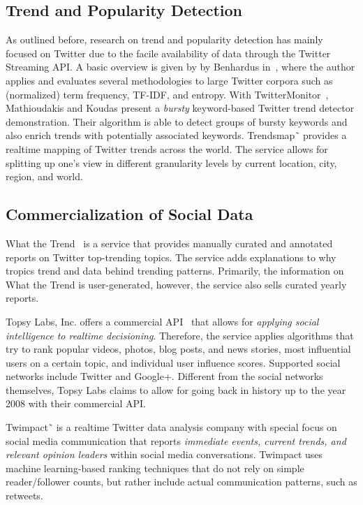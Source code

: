 \documentclass{iosart2c}
\begin{document}
\subsection{Trend and Popularity Detection}
As outlined before, research on trend and popularity detection has mainly focused on Twitter due to the facile availability of data through the Twitter Streaming API.
A basic overview is given by by Benhardus in~\cite{benhardus2010streaming}, where the author applies and evaluates several methodologies to large Twitter corpora such as (normalized) term frequency, TF-IDF, and entropy.
With TwitterMonitor~\cite{Mathioudakis:2010:TTD:1807167.1807306}, Mathioudakis and Koudas present a \textit{bursty} keyword-based Twitter trend detector demonstration.
Their algorithm is able to detect groups of bursty keywords and also enrich trends with potentially associated keywords.
Trendsmap˜\cite{trendsmap} provides a realtime mapping of Twitter trends across the world.
The service allows for splitting up one's view in different granularity levels by current location, city, region, and world.

\subsection{Commercialization of Social Data}
What the Trend~\cite{whatthetrend} is a service that provides manually curated and annotated reports on Twitter top-trending topics.
The service adds explanations to why tropics trend and data behind trending patterns.
Primarily, the information on What the Trend is user-generated, however, the service also sells curated yearly reports.

Topsy Labs, Inc. offers a commercial API~\cite{topsy} that allows for \textit{applying social intelligence to realtime decisioning}.
Therefore, the service applies algorithms that try to rank popular videos, photos, blog posts, and news stories, most influential users on a certain topic, and individual user influence scores.
Supported social networks include Twitter and Google+.
Different from the social networks themselves, Topsy Labs claims to allow for going back in history up to the year 2008 with their commercial API.

Twimpact˜\cite{twimpact} is a realtime Twitter data analysis company with special focus on social media communication that reports \textit{immediate events, current trends, and relevant opinion leaders} within social media conversations.
Twimpact uses machine learning-based ranking techniques that do not rely on simple reader/follower counts, but rather include actual communication patterns, such as retweets. 
\end{document}
